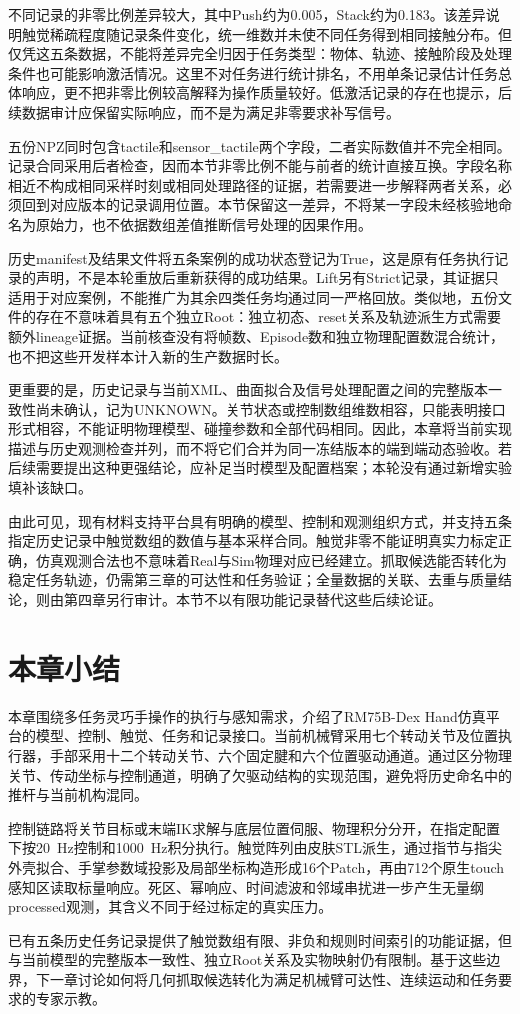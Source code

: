 不同记录的非零比例差异较大，其中Push约为0.005，Stack约为0.183。该差异说明触觉稀疏程度随记录条件变化，统一维数并未使不同任务得到相同接触分布。但仅凭这五条数据，不能将差异完全归因于任务类型：物体、轨迹、接触阶段及处理条件也可能影响激活情况。这里不对任务进行统计排名，不用单条记录估计任务总体响应，更不把非零比例较高解释为操作质量较好。低激活记录的存在也提示，后续数据审计应保留实际响应，而不是为满足非零要求补写信号。

五份NPZ同时包含tactile和sensor\_tactile两个字段，二者实际数值并不完全相同。记录合同采用后者检查，因而本节非零比例不能与前者的统计直接互换。字段名称相近不构成相同采样时刻或相同处理路径的证据，若需要进一步解释两者关系，必须回到对应版本的记录调用位置。本节保留这一差异，不将某一字段未经核验地命名为原始力，也不依据数组差值推断信号处理的因果作用。

历史manifest及结果文件将五条案例的成功状态登记为True，这是原有任务执行记录的声明，不是本轮重放后重新获得的成功结果。Lift另有Strict记录，其证据只适用于对应案例，不能推广为其余四类任务均通过同一严格回放。类似地，五份文件的存在不意味着具有五个独立Root：独立初态、reset关系及轨迹派生方式需要额外lineage证据。当前核查没有将帧数、Episode数和独立物理配置数混合统计，也不把这些开发样本计入新的生产数据时长。

更重要的是，历史记录与当前XML、曲面拟合及信号处理配置之间的完整版本一致性尚未确认，记为UNKNOWN。关节状态或控制数组维数相容，只能表明接口形式相容，不能证明物理模型、碰撞参数和全部代码相同。因此，本章将当前实现描述与历史观测检查并列，而不将它们合并为同一冻结版本的端到端动态验收。若后续需要提出这种更强结论，应补足当时模型及配置档案；本轮没有通过新增实验填补该缺口。

由此可见，现有材料支持平台具有明确的模型、控制和观测组织方式，并支持五条指定历史记录中触觉数组的数值与基本采样合同。触觉非零不能证明真实力标定正确，仿真观测合法也不意味着Real与Sim物理对应已经建立。抓取候选能否转化为稳定任务轨迹，仍需第三章的可达性和任务验证；全量数据的关联、去重与质量结论，则由第四章另行审计。本节不以有限功能记录替代这些后续论证。

\section{本章小结}
\label{sec:platform_summary}

本章围绕多任务灵巧手操作的执行与感知需求，介绍了RM75B-Dex Hand仿真平台的模型、控制、触觉、任务和记录接口。当前机械臂采用七个转动关节及位置执行器，手部采用十二个转动关节、六个固定腱和六个位置驱动通道。通过区分物理关节、传动坐标与控制通道，明确了欠驱动结构的实现范围，避免将历史命名中的推杆与当前机构混同。

控制链路将关节目标或末端IK求解与底层位置伺服、物理积分分开，在指定配置下按20~Hz控制和1000~Hz积分执行。触觉阵列由皮肤STL派生，通过指节与指尖外壳拟合、手掌参数域投影及局部坐标构造形成16个Patch，再由712个原生touch感知区读取标量响应。死区、幂响应、时间滤波和邻域串扰进一步产生无量纲processed观测，其含义不同于经过标定的真实压力。

已有五条历史任务记录提供了触觉数组有限、非负和规则时间索引的功能证据，但与当前模型的完整版本一致性、独立Root关系及实物映射仍有限制。基于这些边界，下一章讨论如何将几何抓取候选转化为满足机械臂可达性、连续运动和任务要求的专家示教。
